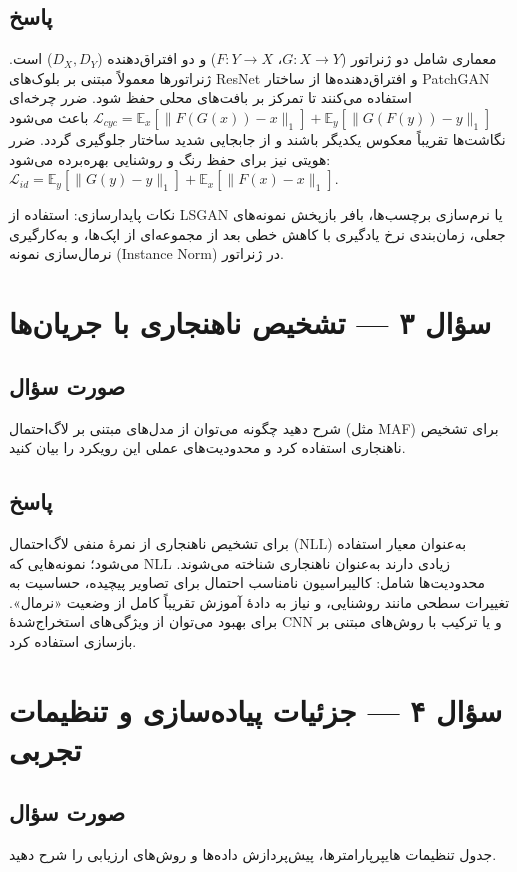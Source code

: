 \subsection{پاسخ}
معماری شامل دو ژنراتور ($G: X\to Y$، $F: Y\to X$) و دو افتراق‌دهنده ($D_X, D_Y$) است. ژنراتورها معمولاً مبتنی بر بلوک‌های ResNet و افتراق‌دهنده‌ها از ساختار PatchGAN استفاده می‌کنند تا تمرکز بر بافت‌های محلی حفظ شود. ضرر چرخه‌ای
\(\mathcal{L}_{cyc}=\mathbb{E}_{x}[\|F(G(x))-x\|_1]+\mathbb{E}_{y}[\|G(F(y))-y\|_1]\)
باعث می‌شود نگاشت‌ها تقریباً معکوس یکدیگر باشند و از جابجایی شدید ساختار جلوگیری گردد. ضرر هویتی نیز برای حفظ رنگ و روشنایی بهره‌برده می‌شود:
\(\mathcal{L}_{id}=\mathbb{E}_{y}[\|G(y)-y\|_1]+\mathbb{E}_{x}[\|F(x)-x\|_1]\).

نکات پایدارسازی: استفاده از LSGAN یا نرم‌سازی برچسب‌ها، بافر بازپخش نمونه‌های جعلی، زمان‌بندی نرخ یادگیری با کاهش خطی بعد از مجموعه‌ای از اپک‌ها، و به‌کارگیری نرمال‌سازی نمونه (Instance Norm) در ژنراتور.

\section{سؤال ۳ — تشخیص ناهنجاری با جریان‌ها}
\subsection{صورت سؤال}
شرح دهید چگونه می‌توان از مدل‌های مبتنی بر لاگ‌احتمال (مثل MAF) برای تشخیص ناهنجاری استفاده کرد و محدودیت‌های عملی این رویکرد را بیان کنید.

\subsection{پاسخ}
برای تشخیص ناهنجاری از نمرهٔ منفی لاگ‌احتمال (NLL) به‌عنوان معیار استفاده می‌شود؛ نمونه‌هایی که NLL زیادی دارند به‌عنوان ناهنجاری شناخته می‌شوند. محدودیت‌ها شامل: کالیبراسیون نامناسب احتمال برای تصاویر پیچیده، حساسیت به تغییرات سطحی مانند روشنایی، و نیاز به دادهٔ آموزش تقریباً کامل از وضعیت «نرمال». برای بهبود می‌توان از ویژگی‌های استخراج‌شدهٔ CNN و یا ترکیب با روش‌های مبتنی بر بازسازی استفاده کرد.

\section{سؤال ۴ — جزئیات پیاده‌سازی و تنظیمات تجربی}
\subsection{صورت سؤال}
جدول تنظیمات هایپرپارامترها، پیش‌پردازش داده‌ها و روش‌های ارزیابی را شرح دهید.

